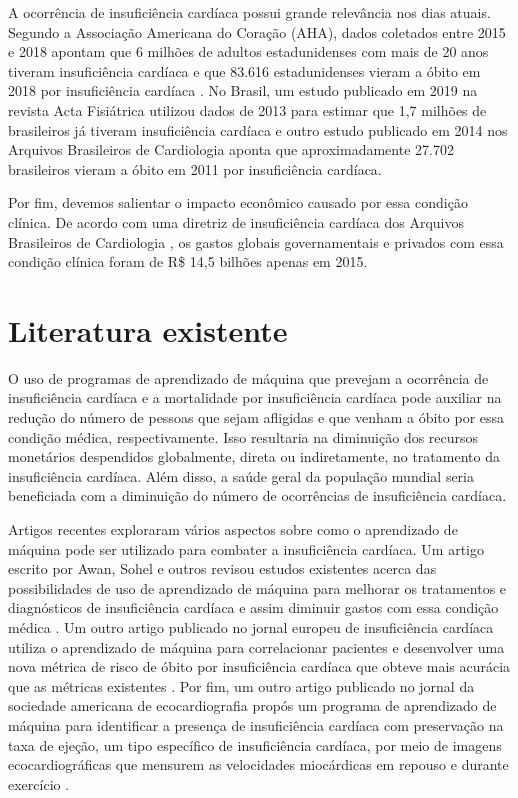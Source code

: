 A ocorrência de insuficiência cardíaca possui grande relevância nos dias atuais. Segundo a Associação Americana do Coração (AHA), dados coletados entre 2015 e 2018 apontam que 6 milhões de adultos estadunidenses com mais de 20 anos tiveram insuficiência cardíaca \cite[p.8]{heart_disease2021} e que 83.616 estadunidenses vieram a óbito em 2018 por insuficiência cardíaca \cite[p.485]{heart_disease2021}. No Brasil, um estudo publicado em 2019 na revista Acta Fisiátrica \cite{nogueira2019} utilizou dados de 2013 para estimar que 1,7 milhões de brasileiros já tiveram insuficiência cardíaca e outro estudo publicado em 2014 nos Arquivos Brasileiros de Cardiologia \cite{gaui2014} aponta que aproximadamente 27.702 brasileiros vieram a óbito em 2011 por insuficiência cardíaca.

Por fim, devemos salientar o impacto econômico causado por essa condição clínica. De acordo com uma diretriz de insuficiência cardíaca dos Arquivos Brasileiros de Cardiologia \cite{diretriz_insuficiencia_cardiaca_2018}, os gastos globais governamentais e privados com essa condição clínica foram de R\$ 14,5 bilhões apenas em 2015.

\section{Literatura existente}

O uso de programas de aprendizado de máquina que prevejam a ocorrência de insuficiência cardíaca e a mortalidade por insuficiência cardíaca pode auxiliar na redução do número de pessoas que sejam afligidas e que venham a óbito por essa condição médica, respectivamente. Isso resultaria na diminuição dos recursos monetários despendidos globalmente, direta ou indiretamente, no tratamento da insuficiência cardíaca. Além disso, a saúde geral da população mundial seria beneficiada com a diminuição do número de ocorrências de insuficiência cardíaca.

Artigos recentes exploraram vários aspectos sobre como o aprendizado de máquina pode ser utilizado para combater a insuficiência cardíaca. Um artigo escrito por Awan, Sohel e outros revisou estudos existentes acerca das possibilidades de uso de aprendizado de máquina para melhorar os tratamentos e diagnósticos de insuficiência cardíaca e assim diminuir gastos com essa condição médica \cite{awan2018}. Um outro artigo publicado no jornal europeu de insuficiência cardíaca utiliza o aprendizado de máquina para correlacionar pacientes e desenvolver uma nova métrica de risco de óbito por insuficiência cardíaca que obteve mais acurácia que as métricas existentes \cite{adler2020}. Por fim, um outro artigo publicado no jornal da sociedade americana de ecocardiografia propós um programa de aprendizado de máquina para identificar a presença de insuficiência cardíaca com preservação na taxa de ejeção, um tipo específico de insuficiência cardíaca, por meio de imagens ecocardiográficas que mensurem as velocidades miocárdicas em repouso e durante exercício \cite{hfpef2018}.

